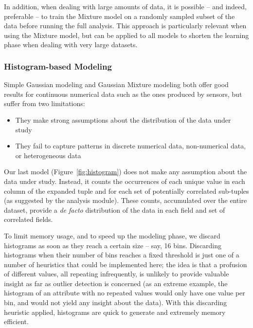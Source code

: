 In addition, when dealing with large amounts of data, it is possible -- and indeed, preferable -- to train the Mixture model on a randomly sampled subset of the data before running the full analysis. This approach is particularly relevant when using the Mixture model, but can be applied to all models to shorten the learning phase when dealing with very large datasets.

\subsubsection{Histogram-based Modeling}
\label{sec:histograms}
Simple Gaussian modeling and Gaussian Mixture modeling both offer good results for continuous numerical data such as the ones produced by sensors, but suffer from two limitations:

\begin{itemize}
\item They make strong assumptions about the distribution of the data under study
\item They fail to capture patterns in discrete numerical data, non-numerical data, or heterogeneous data
\end{itemize}

Our last model (Figure~\ref{fig:histogram}) does not make any assumption about the data under study. Instead, it counts the occurrences of each unique value in each column of the expanded tuple and for each set of potentially correlated sub-tuples (as suggested by the analysis module). These counts, accumulated over the entire dataset, provide a \emph{de facto} distribution of the data in each field and set of correlated fields.

To limit memory usage, and to speed up the modeling phase, we discard histograms as soon as they reach a certain size -- say, 16 bins. Discarding histograms when their number of bins reaches a fixed threshold is just one of a number of heuristics that could be implemented here; the idea is that a profusion of different values, all repeating infrequently, is unlikely to provide valuable insight as far as outlier detection is concerned (as an extreme example, the histogram of an attribute with no repeated values would only have one value per bin, and would not yield any insight about the data). With this discarding heuristic applied, histograms are quick to generate and extremely memory efficient.

